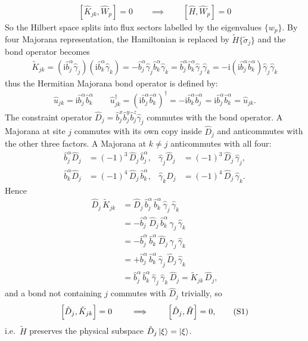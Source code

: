\documentclass[
  aps,
  prl,
  preprint,
  amsmath,
  amssymb,
  superscriptaddress,
  floatfix
]{revtex4-2}
\newcommand{\ii}{\mathrm{i}}
\newcommand{\oga}{\hat \gamma}
\newcommand{\obx}{\hat b^x}
\newcommand{\oby}{\hat b^y}
\newcommand{\obz}{\hat b^z}
\renewcommand{\comm}[2]{\left[ #1 , #2 \right]}
\newcommand{\numberthis}{\refstepcounter{equation}\tag{\theequation}}
\renewcommand{\theequation}{S\arabic{equation}}
\begin{document}
\begin{align*}
  \comm{\hat{K}_{jk}}{\hat{W}_p}= 0 \qquad \implies \qquad \comm{\hat H}{\hat{W}_p} =0
\end{align*}
So the Hilbert space splits into flux sectors labelled by the eigenvalues $\{w_p\}$. By four Majorana representation, the Hamiltonian is replaced by $\tilde{H}\{\tilde{\sigma}_{j}\}$ and the bond operator becomes 
\begin{align*}
  \tilde K_{jk} = (\ii \hat b_j^\alpha \oga_j)(\ii \hat b_k^\alpha \oga_k) 
    = -\hat b_j^\alpha \oga_j \hat b_k^\alpha \oga_k 
    = \hat b_j^\alpha \hat b_k^\alpha \oga_j \oga_k 
    = -\ii (\ii \hat b_j^\alpha \hat b_k^\alpha) \oga_j \oga_k
\end{align*}
thus the Hermitian Majorana bond operator is defined by:
\begin{align*}
  \hat{u}_{jk} = \ii \hat{b}^ \alpha_j \hat{b}^ \alpha_k \qquad \hat u_{jk} ^ \dag = (\ii \hat b^\alpha_j \hat b^ \alpha_k)^ \dag = - \ii \hat b^\alpha_k \hat b^ \alpha_j = \ii \hat b^\alpha_j \hat b^ \alpha_k = \hat u_{jk}.
\end{align*}
The constraint operator $\hat D_j = \obx_j \oby_j \obz_j \oga_j$ commutes
with the bond operator. A Majorana at site $j$ commutes with its own copy
inside $\hat D_j$ and anticommutes with the other three factors. A
Majorana at $k \neq j$ anticommutes with all four:
\begin{align*}
  \hat b^\alpha_j \hat D_j &= (-1)^3\, \hat D_j\, \hat b^\alpha_j,
  &
  \oga_j \hat D_j &= (-1)^3\, \hat D_j\, \oga_j,
  \\
  \hat b^\alpha_k \hat D_j &= (-1)^4\, \hat D_j\, \hat b^\alpha_k,
  &
  \oga_k \hat D_j &= (-1)^4\, \hat D_j\, \oga_k.
\end{align*}
Hence
\begin{align*}
  \hat D_j\, \tilde K_{jk}
  &= \hat D_j\, \hat b^\alpha_j\, \hat b^\alpha_k\, \oga_j\, \oga_k \\
  &= -\hat b^\alpha_j\, \hat D_j\, \hat b^\alpha_k\, \oga_j\, \oga_k \\
  &= -\hat b^\alpha_j\, \hat b^\alpha_k\, \hat D_j\, \oga_j\, \oga_k \\
  &= +\hat b^\alpha_j\, \hat b^\alpha_k\, \oga_j\, \hat D_j\, \oga_k \\
  &= \hat b^\alpha_j\, \hat b^\alpha_k\, \oga_j\, \oga_k\, \hat D_j
   = \tilde K_{jk}\, \hat D_j,
\end{align*}
and a bond not containing $j$ commutes with $\hat D_j$ trivially, so
\begin{align*}
  \comm{\hat{D}_j}{\tilde{K}_{jk}} = 0 \qquad \implies \qquad
  \comm{\hat D_j}{\tilde H} = 0, \numberthis
\end{align*}
i.e.\ $\tilde H$ preserves the physical subspace $\hat D_j \ket{\xi} = \ket{\xi}$.
\end{document}
